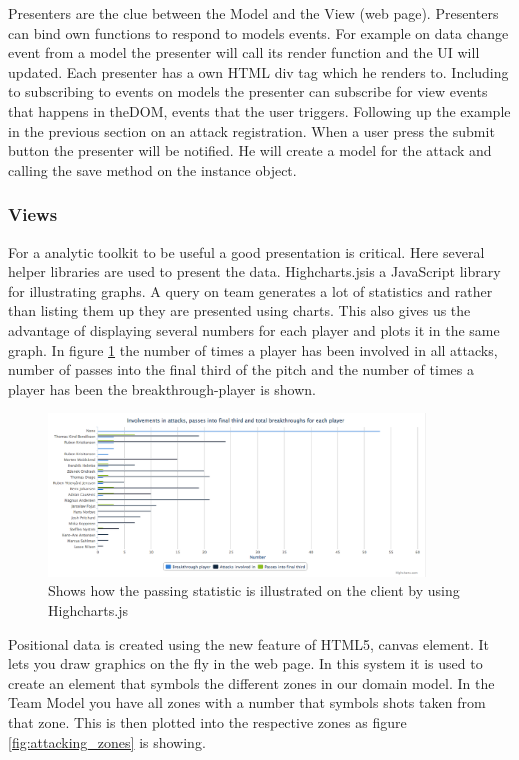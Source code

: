 Presenters are the clue between the Model and the View (web page). Presenters can bind own functions to respond to models events. For example on data change event from a model the presenter will call its render function and the \ac{UI} will updated. Each presenter has a own \ac{HTML} div tag which he renders to. Including to subscribing to events on models the presenter can subscribe for view events that happens in the\ac{DOM}, events that the user triggers. Following up the example in the previous section on an attack registration. When a user press the submit button the presenter will be notified. He will create a model for the attack and calling the save method on the instance object.

\subsubsection{Views}

For a analytic toolkit to be useful a good presentation is critical. Here several helper libraries are used to present the data. Highcharts.js\footnotemark is a JavaScript library for illustrating graphs. A query on team generates a lot of statistics and rather than listing them up they are presented using charts. This also gives us the advantage of displaying several numbers for each player and plots it in the same graph. In figure \ref{fig:chart} the number of times a player has been involved in all attacks, number of passes into the final third of the pitch and the number of times a player has been the breakthrough-player is shown.


\begin{figure}[ht!]
\centering
\includegraphics[width=100mm]{images/general/chart_passes.png}
\caption{Shows how the passing statistic is illustrated on the client by using Highcharts.js}
\label{fig:chart}
\end{figure}

Positional data is created using the new feature of HTML5, canvas element. It lets you draw graphics on the fly in the web page. In this system it is used to create an element that symbols the different zones in our domain model. In the Team Model you have all zones with a number that symbols shots taken from that zone. This is then plotted into the respective zones as figure \ref{fig:attacking_zones} is showing.


